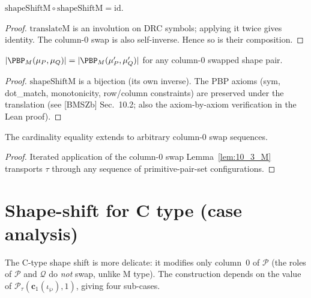 \begin{lemma}
  \label{lem:shapeShiftM_involution}
  \leanok
  $\mathrm{shapeShiftM} \circ \mathrm{shapeShiftM} = \mathrm{id}$.
\end{lemma}
\begin{proof}
  \leanok
  $\mathrm{translateM}$ is an involution on DRC symbols; applying it twice
  gives identity. The column-0 swap is also self-inverse. Hence so is their
  composition.
\end{proof}

\begin{lemma}
  \label{lem:10_3_M}
  \leanok
  $|\PBP_M(\mu_P, \mu_Q)| = |\PBP_M(\mu_P', \mu_Q')|$ for any column-0
  swapped shape pair.
\end{lemma}
\begin{proof}
  \leanok
  $\mathrm{shapeShiftM}$ is a bijection (its own inverse). The PBP axioms
  (sym, dot\_match, monotonicity, row/column constraints) are preserved
  under the translation (see [BMSZb] Sec.~10.2; also the axiom-by-axiom
  verification in the Lean proof).
\end{proof}

\begin{proposition}
  \label{prop:10_2_M}
  \leanok
  The cardinality equality extends to arbitrary column-0 swap sequences.
\end{proposition}
\begin{proof}
  \leanok
  Iterated application of the column-0 swap Lemma~\ref{lem:10_3_M} transports $\tau$ through any sequence of primitive-pair-set configurations.
\end{proof}


\section{Shape-shift for C type (case analysis)}

The C-type shape shift is more delicate: it modifies only column~0 of $\mathcal{P}$
(the roles of $\mathcal{P}$ and $\mathcal{Q}$ do \emph{not} swap, unlike M type).
The construction depends on the value of $\mathcal{P}_\tau(\mathbf{c}_1(\iota_\wp), 1)$,
giving four sub-cases.

